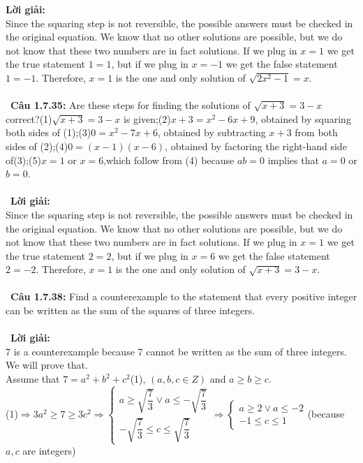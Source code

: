 \documentclass[a4paper]{article}
\begin{document}
\textbf{Lời giải: } \\Since the squaring step is not reversible, the possible answers must be checked in the original equation. We know that no other solutions are possible, but we do not know that these two numbers are in fact solutions. If we plug in $x=1$ we get the true statement $1=1$, but if we plug in $x=-1$ we get the false statement $1=-1$. Therefore, $x=1$ is the one and only solution of $\sqrt{2x^{2}-1}=x$. 
 \\\ \\\
\textbf{Câu 1.7.35: }  Are these steps for finding the solutions of $\sqrt{x+3}=3-x$ correct?(1)$\sqrt{x+3}=3-x$ is given;(2)$x+3=x^{2}-6x+9$, obtained by squaring both sides of (1);(3)$0=x^{2}-7x+6$, obtained by subtracting $x+3$ from both sides of (2);(4)$0=(x-1)(x-6)$, obtained by factoring the right-hand side of(3);(5)$x=1$ or $x=6$,which follow from (4) because $ab=0$ implies that $a=0$ or $b=0$.  \\\ \\\
\textbf{Lời giải: } \\Since the squaring step is not reversible, the possible answers must be checked in the original equation. We know that no other solutions are possible, but we do not know that these two numbers are in fact solutions. If we plug in $x=1$ we get the true statement $2=2$, but if we plug in $x=6$ we get the false statement $2=-2$. Therefore, $x=1$ is the one and only solution of $\sqrt{x+3}=3-x$.  \\\ \\\
\textbf{Câu 1.7.38: } Find a counterexample to the statement that every positive integer can be written as the sum of the squares of three integers. \\\ \\\
\textbf{Lời giải: } \\ 7 is a counterexample because 7 cannot be written as the sum of three integers. We will prove that.
\\Assume that $7=a^{2}+b^{2}+c^{2}$(1), $(a,b,c \in Z)$ and $a \geqslant b \geqslant c$.
\\(1)$\Rightarrow 3a^{2} \geqslant 7 \geqslant 3c^{2} \Rightarrow \begin{cases} a \geqslant \sqrt{\dfrac{7}{3}} \lor a \leqslant-\sqrt{\dfrac{7}{3}}
\\ -\sqrt{\dfrac{7}{3}} \leqslant c \leqslant \sqrt{\dfrac{7}{3}}
\end{cases} \Rightarrow \begin{cases} a \geqslant 2 \lor a \leqslant -2 \\ -1 \leqslant c \leqslant 1 \end{cases} $(because $a,c$ are integers)
\end{document}
